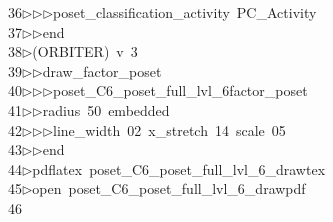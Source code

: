 \begin{tabbing}
36\>$\triangleright$\>$\triangleright$\>$\triangleright$\>poset\_classification\_activity\ PC\_Activity\ \\[0pt]
37\>$\triangleright$\>$\triangleright$\>end\\[0pt]
38\>$\triangleright$\>(ORBITER)\ v\ 3\ \\[0pt]
39\>$\triangleright$\>$\triangleright$\>draw\_factor\_poset\ \\[0pt]
40\>$\triangleright$\>$\triangleright$\>$\triangleright$\>poset\_C6\_poset\_full\_lvl\_6factor\_poset\ \\[0pt]
41\>$\triangleright$\>$\triangleright$\>radius\ 50\ embedded\ \\[0pt]
42\>$\triangleright$\>$\triangleright$\>$\triangleright$\>line\_width\ 02\ x\_stretch\ 14\ scale\ 05\ \\[0pt]
43\>$\triangleright$\>$\triangleright$\>end\\[0pt]
44\>$\triangleright$\>pdflatex\ poset\_C6\_poset\_full\_lvl\_6\_drawtex\\[0pt]
45\>$\triangleright$\>open\ poset\_C6\_poset\_full\_lvl\_6\_drawpdf\\[0pt]
46\>\end{tabbing}
